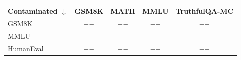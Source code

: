 \begin{tabular}{lcccc}
\toprule
Contaminated $\downarrow$ & GSM8K & MATH & MMLU & TruthfulQA-MC \\
\midrule
GSM8K     & $--$ & $--$ & $--$ & $--$ \\
MMLU      & $--$ & $--$ & $--$ & $--$ \\
HumanEval & $--$ & $--$ & $--$ & $--$ \\
\bottomrule
\end{tabular}
